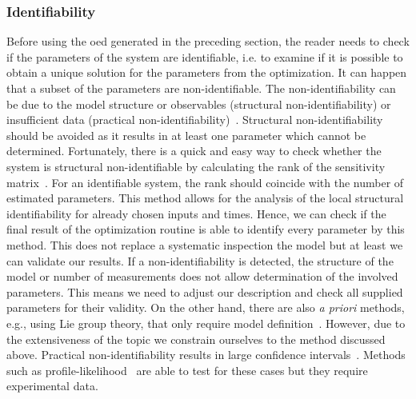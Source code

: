 \documentclass[graybox]{svmult}
\begin{document}
\subsubsection*{Identifiability}
Before using the \acl{oed} generated in the preceding section, the reader needs to check if the parameters of the system are identifiable, i.e. to examine if it is possible to obtain a unique solution for the parameters from the optimization.
It can happen that a subset of the parameters are non-identifiable.
The non-identifiability can be due to the model structure or observables (structural non-identifiability) or insufficient data (practical non-identifiability)~\cite{guillaume_introductory_2019, wieland_structural_2021, walter_identifiability_1996}.
Structural non-identifiability should be avoided as it results in at least one parameter which cannot be determined.
Fortunately, there is a quick and easy way to check whether the system is structural non-identifiable by calculating the rank of the sensitivity matrix~\cite{miao_identifiability_2011, stigter_fast_2015}.
For an identifiable system, the rank should coincide with the number of estimated parameters.
This method allows for the analysis of the local structural identifiability for already chosen inputs and times.
Hence, we can check if the final result of the optimization routine is able to identify every parameter by this method.
This does not replace a systematic inspection the model but at least we can validate our results.
If a non-identifiability is detected, the structure of the model or number of measurements does not allow determination of the involved parameters.
This means we need to adjust our description and check all supplied parameters for their validity.
On the other hand, there are also {\it a priori} methods, e.g., using Lie group theory, that only require model definition~\cite{wieland_structural_2021}.
However, due to the extensiveness of the topic we constrain ourselves to the method discussed above.
Practical non-identifiability results in large confidence intervals~\cite{holmberg_practical_1982, miao_identifiability_2011, kreutzProfileLikelihood2013}.
Methods such as profile-likelihood~\cite{wieland_structural_2021} are able to test for these cases but they require experimental data.
%
\end{document}
